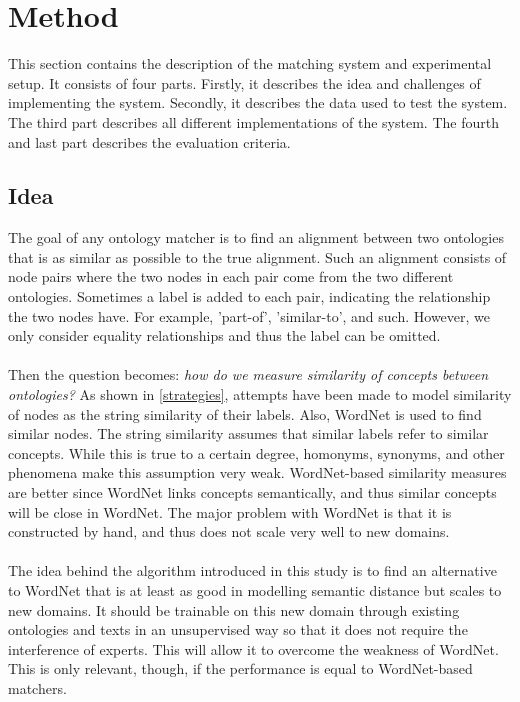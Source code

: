 \documentclass{article}
\begin{document}
 \newpage
 \section{Method} 
 This section contains the description of the matching system and experimental setup. It consists of four parts. Firstly, it describes the idea and challenges of implementing the system. Secondly, it describes the data used to test the system. The third part describes all different implementations of the system. The fourth and last part describes the evaluation criteria.
 
 \subsection{Idea}
The goal of any ontology matcher is to find an alignment between two ontologies that is as similar as possible to the true alignment. Such an alignment consists of node pairs where the two nodes in each pair come from the two different ontologies. Sometimes a label is added to each pair, indicating the relationship the two nodes have. For example, 'part-of', 'similar-to', and such. However, we only consider equality relationships and thus the label can be omitted.
 \paragraph{}
 Then the question becomes: \textit{how do we measure similarity of concepts between ontologies?} As shown in \ref{strategies}, attempts have been made to model similarity of nodes as the string similarity of their labels. Also, WordNet is used to find similar nodes. The string similarity assumes that similar labels refer to similar concepts. While this is true to a certain degree, homonyms, synonyms, and other phenomena make this assumption very weak. WordNet-based similarity measures are better since WordNet links concepts semantically, and thus similar concepts will be close in WordNet. The major problem with WordNet is that it is constructed by hand, and thus does not scale very well to new domains.
 \paragraph{}
 The idea behind the algorithm introduced in this study is to find an alternative to WordNet that is at least as good in modelling semantic distance but scales to new domains. It should be trainable on this new domain through existing ontologies and texts in an unsupervised way so that it does not require the interference of experts. This will allow it to overcome the weakness of WordNet. This is only relevant, though, if the performance is equal to WordNet-based matchers.
\end{document}
